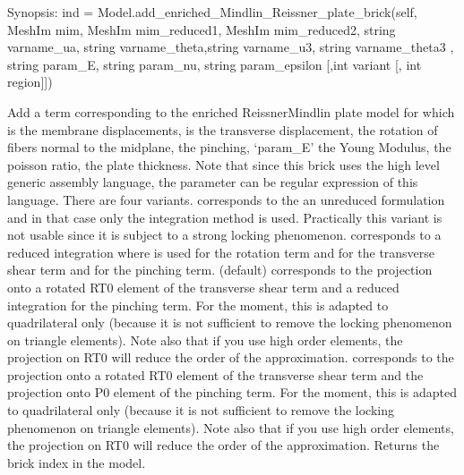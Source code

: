 \documentclass[a4paper,11pt,english]{sphinxmanual}
\begin{document}
\begin{fulllineitems}

\begin{fulllineitems}
\label{\detokenize{python/cmdref_Model:getfem.Model.add_enriched_Mindlin_Reissner_plate_brick}}
Synopsis: ind = Model.add\_enriched\_Mindlin\_Reissner\_plate\_brick(self, MeshIm mim, MeshIm mim\_reduced1, MeshIm mim\_reduced2, string varname\_ua, string varname\_theta,string varname\_u3, string varname\_theta3 , string param\_E, string param\_nu, string param\_epsilon {[},int variant {[}, int region{]}{]})

Add a term corresponding to the enriched Reissner\sphinxhyphen{}Mindlin plate
model for which  is the membrane displacements,
 is the transverse displacement,
 the rotation of
fibers normal to the midplane, 
 the pinching,     
‘param\_E’ the Young Modulus,
 the poisson ratio,
 the plate thickness. Note that since this brick
uses the high level generic assembly language, the parameter can
be regular expression of this language.
There are four variants.
 corresponds to the an
unreduced formulation and in that case only the integration
method  is used. Practically this variant is not usable since
it is subject to a strong locking phenomenon.
 corresponds to a reduced integration where  is
used for the rotation term and  for the transverse
shear term and  for the pinching term.
 (default) corresponds to the projection onto
a rotated RT0 element of the transverse shear term and a reduced integration for the pinching term.
For the moment, this is adapted to quadrilateral only (because it is not sufficient to
remove the locking phenomenon on triangle elements). Note also that if
you use high order elements, the projection on RT0 will reduce the order
of the approximation.
 corresponds to the projection onto
a rotated RT0 element of the transverse shear term and the projection onto P0 element of the pinching term.
For the moment, this is adapted to quadrilateral only (because it is not sufficient to
remove the locking phenomenon on triangle elements). Note also that if
you use high order elements, the projection on RT0 will reduce the order
of the approximation.   
Returns the brick index in the model.


\end{fulllineitems}
\end{fulllineitems}
\end{document}
